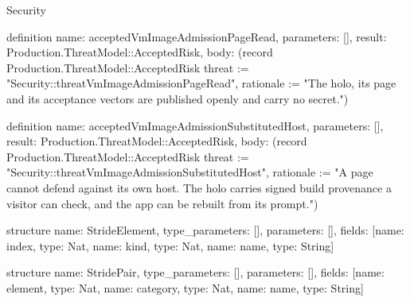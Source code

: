 \begin{lexlean}{Security}
\begin{semanticmodule}
definition{
  name: acceptedVmImageAdmissionPageRead,
  parameters: [],
  result: Production.ThreatModel::AcceptedRisk,
  body: (record Production.ThreatModel::AcceptedRisk {threat := "Security::threatVmImageAdmissionPageRead", rationale := "The holo, its page and its acceptance vectors are published openly and carry no secret."})
}

definition{
  name: acceptedVmImageAdmissionSubstitutedHost,
  parameters: [],
  result: Production.ThreatModel::AcceptedRisk,
  body: (record Production.ThreatModel::AcceptedRisk {threat := "Security::threatVmImageAdmissionSubstitutedHost", rationale := "A page cannot defend against its own host. The holo carries signed build provenance a visitor can check, and the app can be rebuilt from its prompt."})
}

structure{
  name: StrideElement,
  type_parameters: [],
  parameters: [],
  fields: [{name: index, type: Nat}, {name: kind, type: Nat}, {name: name, type: String}]
}

structure{
  name: StridePair,
  type_parameters: [],
  parameters: [],
  fields: [{name: element, type: Nat}, {name: category, type: Nat}, {name: name, type: String}]
}


\end{semanticmodule}
\end{lexlean}
